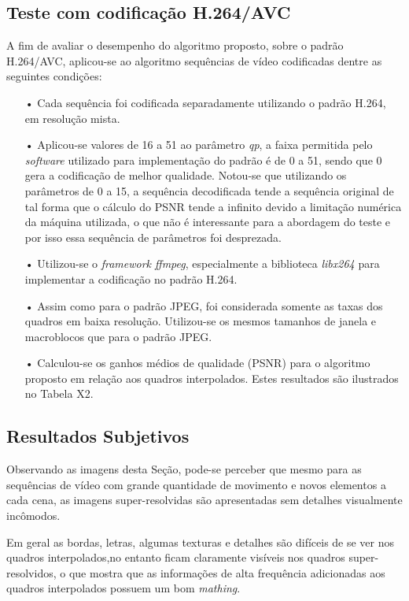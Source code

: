 \subsection{Teste com codificação H.264/AVC}

A fim de avaliar o desempenho do algoritmo proposto, sobre o padrão H.264/AVC, aplicou-se ao algoritmo sequências de vídeo codificadas dentre as seguintes condições:
\begin{itemize}
 \setlength\itemsep{1cm}
\item[•] Cada sequência foi codificada separadamente utilizando o padrão H.264, em resolução mista. 
\item[•] Aplicou-se valores de 16 a 51 ao parâmetro  \textit{qp}, a faixa permitida pelo \textit{software} utilizado para implementação do padrão é de 0 a 51, sendo que 0 gera a codificação de melhor qualidade. Notou-se que utilizando os parâmetros de 0 a 15, a sequência decodificada tende a sequência original de tal forma que o cálculo do PSNR tende a infinito devido a limitação numérica da máquina utilizada, o que não é interessante para a abordagem do teste e por isso essa sequência de parâmetros foi desprezada. 
\item[•] Utilizou-se o \textit{framework ffmpeg}, especialmente a biblioteca \textit{libx264} para implementar a codificação no padrão H.264.
\item[•] Assim como para o padrão JPEG, foi considerada somente as taxas dos quadros em baixa resolução. Utilizou-se os mesmos tamanhos de janela e macroblocos que para o padrão JPEG.
\item[•] Calculou-se os ganhos médios \cite{bjontegaard2001calcuation} de qualidade (PSNR) para o algoritmo proposto em relação aos quadros interpolados. Estes resultados são ilustrados no Tabela X2.
\end{itemize}

\subsection{Resultados Subjetivos}

Observando as imagens desta Seção, pode-se perceber que mesmo para as sequências de vídeo com grande quantidade de movimento e novos elementos a cada cena, as imagens super-resolvidas são apresentadas sem detalhes visualmente incômodos. 

Em geral as bordas, letras, algumas texturas e detalhes são difíceis de se ver nos quadros interpolados,no entanto ficam claramente visíveis nos quadros super-resolvidos, o que mostra que as informações de alta frequência adicionadas aos quadros interpolados possuem um bom \textit{mathing}. 

